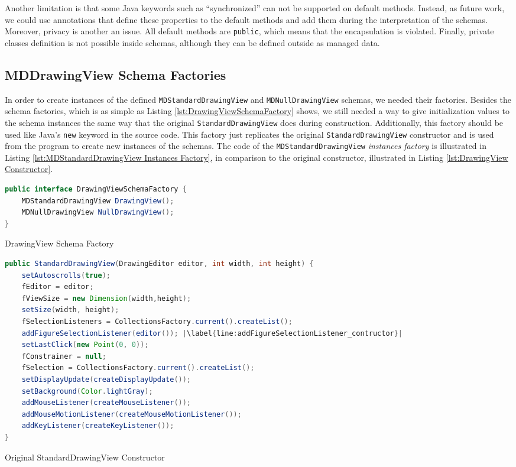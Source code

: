 Another limitation is that some Java keywords such as ``synchronized'' can not be supported on default methods.
Instead, as future work, we could use annotations that define these properties to the default methods and add them during the interpretation of the schemas.
Moreover, privacy is another an issue.
All default methods are \texttt{public}, which means that the encapsulation is violated.
Finally, private classes definition is not possible inside schemas, although they can be defined outside as managed data.

\subsection{MDDrawingView Schema Factories}
In order to create instances of the defined \texttt{MDStandardDrawingView} and \texttt{MDNullDrawingView} schemas, we needed their factories.
Besides the schema factories, which is as simple as Listing \ref{lst:DrawingViewSchemaFactory} shows, we still needed a way to give initialization values to the schema instances the same way that the original \texttt{StandardDrawingView} does during construction.
Additionally, this factory should be used like Java's \texttt{new} keyword in the source code.
This factory just replicates the original \texttt{StandardDrawingView} constructor and is used from the program to create new instances of the schemas.
The code of the \texttt{MDStandardDrawingView} \textit{instances factory} is illustrated in Listing \ref{lst:MDStandardDrawingView Instances Factory}, in comparison to the original constructor, illustrated in Listing \ref{lst:DrawingView Constructor}.

\begin{sourcecode}[H]
	\begin{lstlisting}[language=Java, escapechar=|]
public interface DrawingViewSchemaFactory {
	MDStandardDrawingView DrawingView();
	MDNullDrawingView NullDrawingView();
}
	\end{lstlisting}
	\caption{DrawingView Schema Factory}
	\label{lst:DrawingViewSchemaFactory}
\end{sourcecode}

\begin{sourcecode}[H]
	\begin{lstlisting}[language=Java, escapechar=|]
public StandardDrawingView(DrawingEditor editor, int width, int height) {
	setAutoscrolls(true);
	fEditor = editor;
	fViewSize = new Dimension(width,height);
	setSize(width, height);
	fSelectionListeners = CollectionsFactory.current().createList();
	addFigureSelectionListener(editor()); |\label{line:addFigureSelectionListener_contructor}|
	setLastClick(new Point(0, 0));
	fConstrainer = null;
	fSelection = CollectionsFactory.current().createList();
	setDisplayUpdate(createDisplayUpdate());
	setBackground(Color.lightGray);
	addMouseListener(createMouseListener());
	addMouseMotionListener(createMouseMotionListener());
	addKeyListener(createKeyListener());
}
	\end{lstlisting}
	\label{lst:DrawingView Constructor}
	\caption{Original StandardDrawingView Constructor}
\end{sourcecode}

